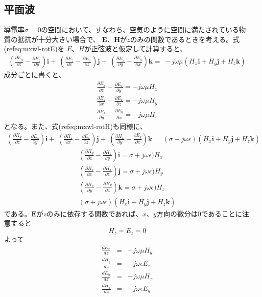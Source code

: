 \subsection{平面波}
導電率$\sigma=0$の空間において、すなわち、空気のように空間に満たされている物質の抵抗が十分大きい場合で、
$\bm{E}$、$\bm{H}$が$z$のみの関数であるときを考える。式(ref{eq:mxwl-rotE})を
$E$、$H$が正弦波と仮定して計算すると、
\begin{eqnarray}
(\frac{\partial E_y}{\partial z} - \frac{\partial E_z}{\partial y})\bm{i} +\
(\frac{\partial E_z}{\partial x} - \frac{\partial E_x}{\partial z})\bm{j} +\
(\frac{\partial E_x}{\partial y} - \frac{\partial E_y}{\partial x})\bm{k} =\
-j\omega\mu(H_x\bm{i}+H_y\bm{j}+H_z\bm{k})
\end{eqnarray}
成分ごとに書くと、
\begin{eqnarray}
\frac{\partial E_y}{\partial z} - \frac{\partial E_z}{\partial y} =- j\omega\mu H_x  \\
\frac{\partial E_z}{\partial x} - \frac{\partial E_x}{\partial z} =- j\omega\mu H_y  \\
\frac{\partial E_x}{\partial y} - \frac{\partial E_y}{\partial x} = - j\omega\mu H_z  
\end{eqnarray}
となる。また、式(ref{eq:mxwl-rotH})も同様に、
\begin{eqnarray}
(\frac{\partial H_y}{\partial z} - \frac{\partial E_z}{\partial y})\bm{i} +\
(\frac{\partial H_z}{\partial x} - \frac{\partial E_x}{\partial z})\bm{j} +\
(\frac{\partial H_x}{\partial y} - \frac{\partial E_y}{\partial x})\bm{k} =\
(\sigma + j\omega\epsilon)(H_x\bm{i}+H_y\bm{j}+H_z\bm{k})
\end{eqnarray}
\begin{eqnarray}
(\frac{\partial H_y}{\partial z} - \frac{\partial H_z}{\partial y})\bm{i} = \sigma + j\omega\epsilon)H_x\\
(\frac{\partial H_z}{\partial x} - \frac{\partial H_x}{\partial z})\bm{j} = \sigma + j\omega\epsilon)H_y\\
(\frac{\partial H_x}{\partial y} - \frac{\partial H_y}{\partial x})\bm{k} = \sigma + j\omega\epsilon)H_z\\
(\sigma + j\omega\epsilon)(H_x\bm{i}+H_y\bm{j}+H_z\bm{k})
\end{eqnarray}
である。$\bm{E}$が$z$のみに依存する関数であれば、$x$、$y$方向の微分は$0$であることに注意すると
\begin{equation}
H_z = E_z =0
\end{equation}
よって
\begin{eqnarray}
\frac{dE_x}{dz} &=& -j\omega\mu H_y \\
\frac{dH_y}{dz} &=& -j\omega\epsilon E_x\\
\frac{dE_y}{dz} &=& -j\omega\mu H_x \\
\frac{dH_x}{dz} &=& -j\omega\epsilon E_y
\end{eqnarray}





